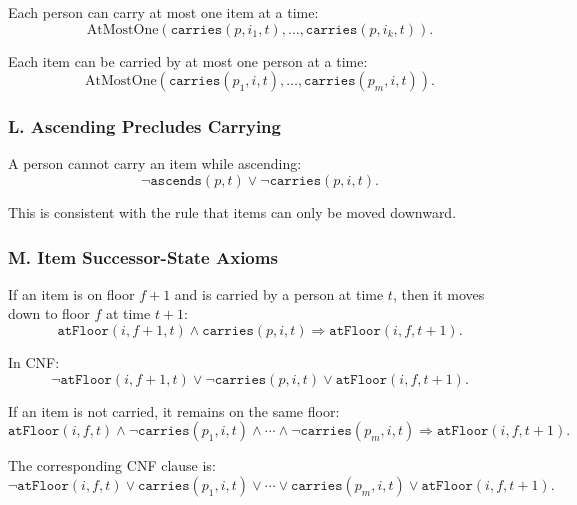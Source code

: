 Each person can carry at most one item at a time:
\[
    \text{AtMostOne}\left(
                        \texttt{carries}(p,i_1,t),
                        \ldots,
                        \texttt{carries}(p,i_k,t)
    \right).
\]

\noindent Each item can be carried by at most one person at a time:
\[
    \text{AtMostOne}\left(
                        \texttt{carries}(p_1,i,t),
                        \ldots,
                        \texttt{carries}(p_m,i,t)
    \right).
\]

\subsubsection*{L. Ascending Precludes Carrying}

A person cannot carry an item while ascending:
\[
    \neg \texttt{ascends}(p,t)
    \lor
    \neg \texttt{carries}(p,i,t).
\]

\noindent This is consistent with the rule that items can only be moved downward.

\subsubsection*{M. Item Successor-State Axioms}

If an item is on floor $f+1$ and is carried by a person at time $t$, then it moves down to floor $f$ at time $t+1$:
\[
    \texttt{atFloor}(i,f+1,t)
    \land
    \texttt{carries}(p,i,t)
    \Rightarrow
    \texttt{atFloor}(i,f,t+1).
\]

\noindent In CNF:
\[
    \neg \texttt{atFloor}(i,f+1,t)
    \lor
    \neg \texttt{carries}(p,i,t)
    \lor
    \texttt{atFloor}(i,f,t+1).
\]

\noindent If an item is not carried, it remains on the same floor:
\[
    \texttt{atFloor}(i,f,t)
    \land
    \neg \texttt{carries}(p_1,i,t)
    \land \cdots \land
    \neg \texttt{carries}(p_m,i,t)
    \Rightarrow
    \texttt{atFloor}(i,f,t+1).
\]

\noindent The corresponding CNF clause is:
\[
    \neg \texttt{atFloor}(i,f,t)
    \lor
    \texttt{carries}(p_1,i,t)
    \lor \cdots \lor
    \texttt{carries}(p_m,i,t)
    \lor
    \texttt{atFloor}(i,f,t+1).
\]